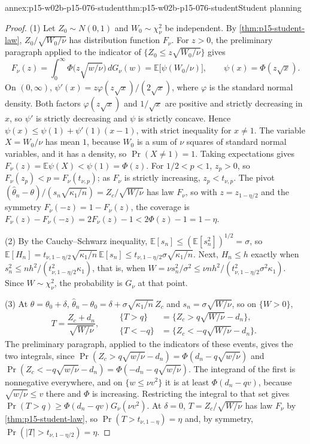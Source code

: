 \begin{annexitem}{annex:p15-w02b-p15-076-student}{thm:p15-w02b-p15-076-student}{Student planning}
\begin{proof}
(1) Let \(Z_0\sim N(0,1)\) and \(W_0\sim\chi^2_\nu\) be independent. By
\cref{thm:p15-student-law}, \(Z_0/\sqrt{W_0/\nu}\) has distribution
function \(F_\nu\). For \(z>0\), the preliminary paragraph applied to the
indicator of \(\{Z_0\leq z\sqrt{W_0/\nu}\}\) gives
\[
 F_\nu(z)=\int_0^\infty\Phi\bigl(z\sqrt{w/\nu}\bigr)\,dG_\nu(w)
        =\mathbb E\bigl[\psi(W_0/\nu)\bigr],\qquad
 \psi(x)=\Phi(z\sqrt x).
\]
On \((0,\infty)\), \(\psi'(x)=z\varphi(z\sqrt x)/(2\sqrt x)\), where
\(\varphi\) is the standard normal density. Both factors
\(\varphi(z\sqrt x)\) and \(1/\sqrt x\) are positive and strictly
decreasing in \(x\), so \(\psi'\) is strictly decreasing and \(\psi\) is
strictly concave. Hence \(\psi(x)\leq\psi(1)+\psi'(1)(x-1)\), with strict
inequality for \(x\ne1\). The variable \(X=W_0/\nu\) has mean \(1\),
because \(W_0\) is a sum of \(\nu\) squares of standard normal variables,
and it has a density, so \(\Pr(X\ne1)=1\). Taking expectations gives
\(F_\nu(z)=\mathbb E\psi(X)<\psi(1)=\Phi(z)\). For \(1/2<p<1\),
\(z_p>0\), so \(F_\nu(z_p)<p=F_\nu(t_{\nu,p})\); as \(F_\nu\) is strictly
increasing, \(z_p<t_{\nu,p}\). The pivot
\((\widehat\theta_n-\theta)/(s_n\sqrt{\kappa_1/n})=Z_c/\sqrt{W/\nu}\) has
law \(F_\nu\), so with \(z=z_{1-\eta/2}\) and the symmetry
\(F_\nu(-z)=1-F_\nu(z)\), the coverage is
\(F_\nu(z)-F_\nu(-z)=2F_\nu(z)-1<2\Phi(z)-1=1-\eta\).

(2) By the Cauchy--Schwarz inequality,
\(\mathbb E[s_n]\leq(\mathbb E[s_n^2])^{1/2}=\sigma\), so
\(\mathbb E[H_n]=t_{\nu,1-\eta/2}\sqrt{\kappa_1/n}\,\mathbb E[s_n]
\leq t_{\nu,1-\eta/2}\sigma\sqrt{\kappa_1/n}\). Next,
\(H_n\leq h\) exactly when
\(s_n^2\leq nh^2/(t_{\nu,1-\eta/2}^2\kappa_1)\), that is, when
\(W=\nu s_n^2/\sigma^2\leq\nu nh^2/(t_{\nu,1-\eta/2}^2\sigma^2\kappa_1)\).
Since \(W\sim\chi^2_\nu\), the probability is \(G_\nu\) at that point.

(3) At \(\theta=\theta_0+\delta\),
\(\widehat\theta_n-\theta_0=\delta+\sigma\sqrt{\kappa_1/n}\,Z_c\) and
\(s_n=\sigma\sqrt{W/\nu}\), so on \(\{W>0\}\),
\[
 T=\frac{Z_c+d_n}{\sqrt{W/\nu}},\qquad
 \begin{aligned}
 \{T>q\}&=\{Z_c>q\sqrt{W/\nu}-d_n\},\\
 \{T<-q\}&=\{Z_c<-q\sqrt{W/\nu}-d_n\}.
 \end{aligned}
\]
The preliminary paragraph, applied to the indicators of these events,
gives the two integrals, since
\(\Pr(Z_c>q\sqrt{w/\nu}-d_n)=\Phi(d_n-q\sqrt{w/\nu})\) and
\(\Pr(Z_c<-q\sqrt{w/\nu}-d_n)=\Phi(-d_n-q\sqrt{w/\nu})\). The integrand of
the first is nonnegative everywhere, and on \(\{w\leq\nu v^2\}\) it is at
least \(\Phi(d_n-qv)\), because \(\sqrt{w/\nu}\leq v\) there and \(\Phi\)
is increasing. Restricting the integral to that set gives
\(\Pr(T>q)\geq\Phi(d_n-qv)G_\nu(\nu v^2)\). At \(\delta=0\),
\(T=Z_c/\sqrt{W/\nu}\) has law \(F_\nu\) by \cref{thm:p15-student-law}, so
\(\Pr(T>t_{\nu,1-\eta})=\eta\) and, by symmetry,
\(\Pr(|T|>t_{\nu,1-\eta/2})=\eta\).
\end{proof}
\end{annexitem}
